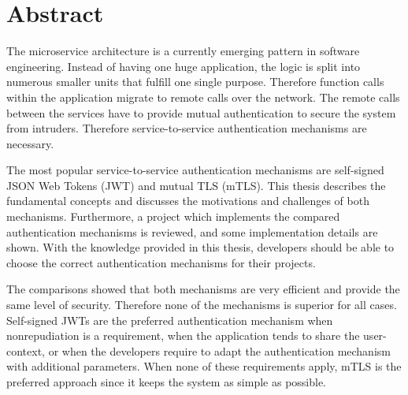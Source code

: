 \chapter{Abstract}
The microservice architecture is a currently emerging pattern in software engineering.
Instead of having one huge application, the logic is split into numerous smaller units that fulfill one single purpose.
Therefore function calls within the application migrate to remote calls over the network.
The remote calls between the services have to provide mutual authentication to secure the system from intruders.
Therefore service-to-service authentication mechanisms are necessary. 

The most popular service-to-service authentication mechanisms are self-signed JSON Web Tokens (JWT) and mutual TLS (mTLS).
This thesis describes the fundamental concepts and discusses the motivations and challenges of both mechanisms.
Furthermore, a project which implements the compared authentication mechanisms is reviewed, and some implementation details are shown.
With the knowledge provided in this thesis, developers should be able to choose the correct authentication mechanisms for their projects. 

The comparisons showed that both mechanisms are very efficient and provide the same level of security.
Therefore none of the mechanisms is superior for all cases.
Self-signed JWTs are the preferred authentication mechanism when nonrepudiation is a requirement, when the application tends to share the user-context, or when the developers require to adapt the authentication mechanism with additional parameters.
When none of these requirements apply, mTLS is the preferred approach since it keeps the system as simple as possible.


